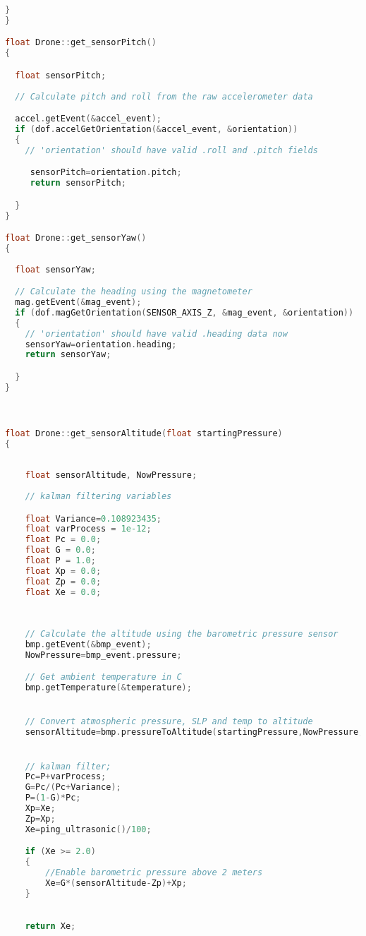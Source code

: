 \begin{lstlisting}[language=C,caption={Drone.cpp Arduino Library File},label={lst:Drone.cpp}]
  }
}

float Drone::get_sensorPitch()
{

  float sensorPitch;
    
  // Calculate pitch and roll from the raw accelerometer data

  accel.getEvent(&accel_event);
  if (dof.accelGetOrientation(&accel_event, &orientation))
  {
    // 'orientation' should have valid .roll and .pitch fields

     sensorPitch=orientation.pitch;
     return sensorPitch;

  }
}

float Drone::get_sensorYaw()
{
    
  float sensorYaw;

  // Calculate the heading using the magnetometer
  mag.getEvent(&mag_event);
  if (dof.magGetOrientation(SENSOR_AXIS_Z, &mag_event, &orientation))
  {
    // 'orientation' should have valid .heading data now
    sensorYaw=orientation.heading;
    return sensorYaw;

  }
}



float Drone::get_sensorAltitude(float startingPressure)
{
    
    
    float sensorAltitude, NowPressure;
    
    // kalman filtering variables

    float Variance=0.108923435;
    float varProcess = 1e-12;
    float Pc = 0.0;
    float G = 0.0;
    float P = 1.0;
    float Xp = 0.0;
    float Zp = 0.0;
    float Xe = 0.0;
    
    
   
    // Calculate the altitude using the barometric pressure sensor
    bmp.getEvent(&bmp_event);
    NowPressure=bmp_event.pressure;

    // Get ambient temperature in C
    bmp.getTemperature(&temperature);


    // Convert atmospheric pressure, SLP and temp to altitude
    sensorAltitude=bmp.pressureToAltitude(startingPressure,NowPressure,temperature);


    // kalman filter;
    Pc=P+varProcess;
    G=Pc/(Pc+Variance);
    P=(1-G)*Pc;
    Xp=Xe;
    Zp=Xp;
    Xe=ping_ultrasonic()/100;

    if (Xe >= 2.0)
    {
        //Enable barometric pressure above 2 meters
        Xe=G*(sensorAltitude-Zp)+Xp;
    }

       
    return Xe;
        
    
        

\end{lstlisting}
